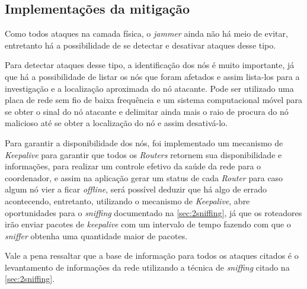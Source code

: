\subsection{Implementações da mitigação}
\par Como todos ataques na camada física, o \emph{jammer} ainda não há meio de evitar, entretanto há a possibilidade de se detectar e desativar ataques desse tipo.

\par Para detectar ataques desse tipo, a identificação dos nós é muito importante, j\'a que há a possibilidade de listar os nós que foram afetados e assim lista-los para a investigação e a localização aproximada do nó atacante. Pode ser utilizado uma placa de rede sem fio de baixa frequência e um sistema computacional móvel para se obter o sinal do nó atacante e delimitar ainda mais o raio de procura do nó malicioso até se obter a localização do nó e assim desativá-lo.

\par Para garantir a disponibilidade dos n\'os, foi implementado um mecanismo de \emph{Keepalive} para garantir que todos os \emph{Routers} retornem sua disponibilidade e informa\c{c}\~oes, para realizar um controle efetivo da sa\'ude da rede para o coordenador, e assim na aplica\c{c}\~ao gerar um status de cada \emph{Router} para caso algum n\'o vier a ficar \emph{offline}, ser\'a poss\'ivel deduzir que h\'a algo de errado acontecendo, entretanto, utilizando o mecanismo de \emph{Keepalive}, abre oportunidades para o \emph{sniffing} documentado na \autoref{sec:2sniffing}, j\'a que os roteadores ir\~ao enviar pacotes de \emph{keepalive} com um intervalo de tempo fazendo com que o \emph{sniffer} obtenha uma quantidade maior de pacotes.

\par Vale a pena ressaltar que a base de informa\c{c}\~ao para todos os ataques citados \'e o levantamento de informa\c{c}\~oes da rede utilizando a t\'ecnica de \emph{sniffing} citado na \autoref{sec:2sniffing}.